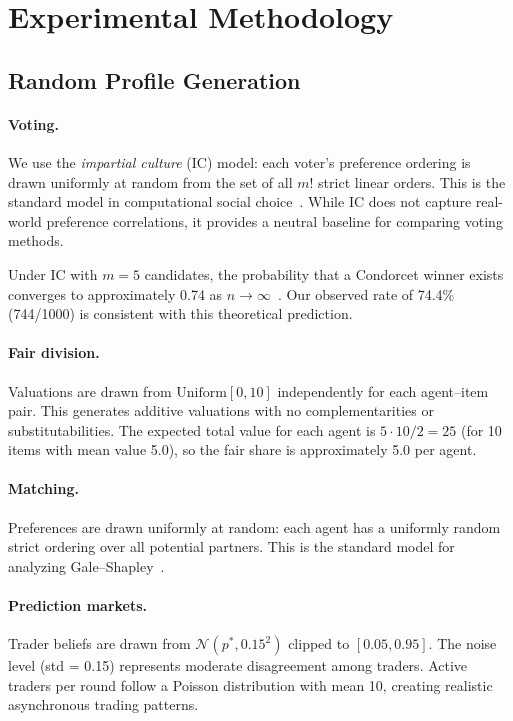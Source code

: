 \documentclass[10pt]{article}
\begin{document}
\section{Experimental Methodology}
\label{app:methodology}

\subsection{Random Profile Generation}

\paragraph{Voting.}
We use the \emph{impartial culture} (IC) model: each voter's preference ordering is drawn uniformly at random from the set of all $m!$ strict linear orders. This is the standard model in computational social choice~\citep{gehrlein2006condorcet}. While IC does not capture real-world preference correlations, it provides a neutral baseline for comparing voting methods.

Under IC with $m = 5$ candidates, the probability that a Condorcet winner exists converges to approximately 0.74 as $n \to \infty$~\citep{gehrlein2006condorcet}. Our observed rate of 74.4\% (744/1000) is consistent with this theoretical prediction.

\paragraph{Fair division.}
Valuations are drawn from $\text{Uniform}[0, 10]$ independently for each agent--item pair. This generates additive valuations with no complementarities or substitutabilities. The expected total value for each agent is $5 \cdot 10 / 2 = 25$ (for 10 items with mean value 5.0), so the fair share is approximately 5.0 per agent.

\paragraph{Matching.}
Preferences are drawn uniformly at random: each agent has a uniformly random strict ordering over all potential partners. This is the standard model for analyzing Gale--Shapley~\citep{knuth1976mariages}.

\paragraph{Prediction markets.}
Trader beliefs are drawn from $\mathcal{N}(p^*, 0.15^2)$ clipped to $[0.05, 0.95]$. The noise level (std = 0.15) represents moderate disagreement among traders. Active traders per round follow a Poisson distribution with mean 10, creating realistic asynchronous trading patterns.
\end{document}
